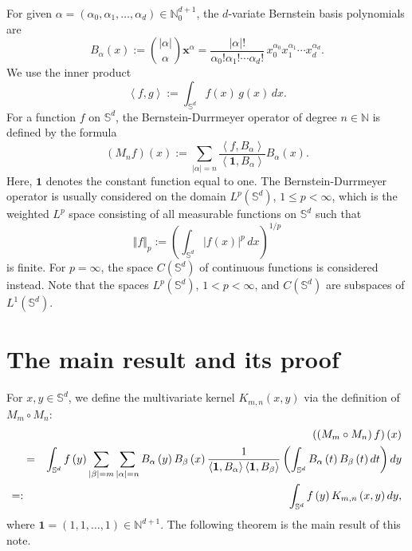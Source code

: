 \documentclass[12pt,reqno]{article}
\begin{document}
For given $\alpha =\left( \alpha _{0},\alpha _{1},\ldots ,\alpha _{d}\right)
\in \mathbb{N}_{0}^{d+1}$, the $d$-variate Bernstein basis polynomials are 
\begin{equation*}
B_{\alpha }\left( x\right) :={\binom{\left\vert \alpha \right\vert }{\alpha }%
}\mathbf{x}^{\alpha }=\frac{\left\vert \alpha \right\vert !}{\alpha
_{0}!\alpha _{1}!\cdots \alpha _{d}!}\,x_{0}^{\alpha _{0}}x_{1}^{\alpha
_{1}}\cdots x_{d}^{\alpha _{d}}.
\end{equation*}%
We use the inner product 
\begin{equation*}
\left\langle f,g\right\rangle :=\int_{\mathbb{S}^{d}}f\left( x\right)
\,g\left( x\right) \,dx.
\end{equation*}%
For a function $f$ on $\mathbb{S}^{d}$, the Bernstein-Durrmeyer operator of
degree $n\in \mathbb{N}$ is defined by the formula 
\begin{equation*}
\left( M_{n}f\right) \left( x\right) :=\sum_{\left\vert \alpha \right\vert
=n}\frac{\left\langle f,B_{\alpha }\right\rangle }{\left\langle \mathbf{1}%
,B_{\alpha }\right\rangle }B_{\alpha }\left( x\right) .
\end{equation*}%
Here, $\mathbf{1}$ denotes the constant function equal to one. The
Bernstein-Durrmeyer operator is usually considered on the domain $%
L^{p}\left( \mathbb{S}^{d}\right) $, $1\leq p<\infty $, which is the
weighted $L^{p}$ space consisting of all measurable functions on $\mathbb{S}%
^{d}$ such that 
\begin{equation*}
\Vert f\Vert _{p}:=\left( \int_{\mathbb{S}^{d}}\left\vert f\left( x\right)
\right\vert ^{p}\,dx\right) ^{1/p}
\end{equation*}%
is finite. For $p=\infty $, the space $C\left( \mathbb{S}^{d}\right) $ of
continuous functions is considered instead. Note that the spaces $%
L^{p}\left( \mathbb{S}^{d}\right) $, $1<p<\infty $, and $C\left( \mathbb{S}%
^{d}\right) $ are subspaces of $L^{1}\left( \mathbb{S}^{d}\right) $.

\section{The main result and its proof}

For $x,y\in \mathbb{S}^{d}$, we define the multivariate kernel $%
K_{m,n}\left( x,y\right) $ via the definition of $M_{m}\circ M_{n}$: 
\begin{eqnarray*}
&&\left( \left( M_{m}\circ M_{n}\right) f\right) \left( x\right)  \\
&=&\int_{\mathbb{S}^{d}}f\left( y\right) \sum_{\left\vert \beta \right\vert
=m}\sum_{\left\vert \alpha \right\vert =n}B_{\alpha }\left( y\right)
B_{\beta }\left( x\right) \frac{1}{\left\langle \mathbf{1},B_{\alpha
}\right\rangle \left\langle \mathbf{1},B_{\beta }\right\rangle }\left( \int_{%
\mathbb{S}^{d}}B_{\alpha }\left( t\right) B_{\beta }\left( t\right)
dt\right) dy \\
=: &&\int_{\mathbb{S}^{d}}f\left( y\right) K_{m,n}\left( x,y\right) dy,
\end{eqnarray*}%
where $\mathbf{1=}\left( 1,1,\ldots ,1\right) \in \mathbb{N}^{d+1}$. The
following theorem is the main result of this note.
\end{document}
